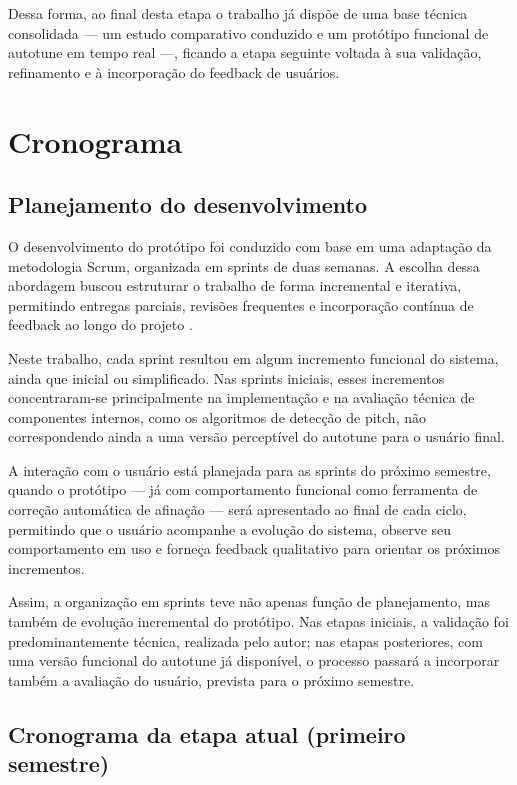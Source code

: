 Dessa forma, ao final desta etapa o trabalho já dispõe de uma base técnica
consolidada --- um estudo comparativo conduzido e um protótipo funcional de
autotune em tempo real ---, ficando a etapa seguinte voltada à sua validação,
refinamento e à incorporação do feedback de usuários.


\chapter{\label{chap:cronograma}Cronograma}

\section{Planejamento do desenvolvimento}

O desenvolvimento do protótipo foi conduzido com base em uma adaptação da metodologia Scrum, organizada em sprints de duas semanas. A escolha dessa abordagem buscou estruturar o trabalho de forma incremental e iterativa, permitindo entregas parciais, revisões frequentes e incorporação contínua de feedback ao longo do projeto \cite{srivastava2017scrum}.

Neste trabalho, cada sprint resultou em algum incremento funcional do sistema, ainda que inicial ou simplificado. Nas sprints iniciais, esses incrementos concentraram-se principalmente na implementação e na avaliação técnica de componentes internos, como os algoritmos de detecção de pitch, não correspondendo ainda a uma versão perceptível do autotune para o usuário final.

A interação com o usuário está planejada para as sprints do próximo semestre, quando o protótipo --- já com comportamento funcional como ferramenta de correção automática de afinação --- será apresentado ao final de cada ciclo, permitindo que o usuário acompanhe a evolução do sistema, observe seu comportamento em uso e forneça feedback qualitativo para orientar os próximos incrementos.

Assim, a organização em sprints teve não apenas função de planejamento, mas também de evolução incremental do protótipo. Nas etapas iniciais, a validação foi predominantemente técnica, realizada pelo autor; nas etapas posteriores, com uma versão funcional do autotune já disponível, o processo passará a incorporar também a avaliação do usuário, prevista para o próximo semestre.

\section{Cronograma da etapa atual (primeiro semestre)}

